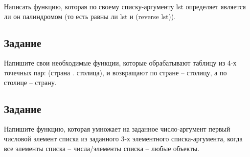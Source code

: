 Написать функцию, которая по своему списку-аргументу lst определяет является ли он палиндромом (то есть равны ли lst и (reverse lst)).



\subsection{Задание }

Напишите свои необходимые функции, которые обрабатывают таблицу из 4-х точечных пар: (страна . столица), и возвращают по стране -- столицу, а по столице -- страну.


\subsection{Задание }

Напишите функцию, которая умножает на заданное число-аргумент первый числовой элемент списка из заданного 3-х элементного списка-аргумента, когда все элементы списка -- числа/элементы списка -- любые объекты.

